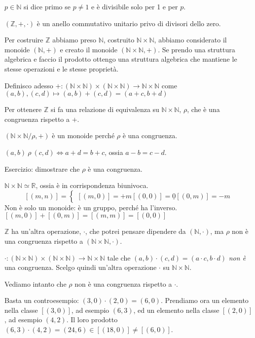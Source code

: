 $p \in \mathbb{N}$ si dice primo se $p \neq 1$ e \`e divisibile solo per 1 e per $p$.

$(\mathbb{Z}, +, \cdot)$ \`e un anello commutativo unitario privo di divisori dello zero.

Per costruire $\mathbb{Z}$ abbiamo preso $\mathbb{N}$, costruito $\mathbb{N} \times \mathbb{N}$, abbiamo considerato il monoide $(\mathbb{N}, +)$ e creato il monoide $(\mathbb{N} \times \mathbb{N}, +)$. Se prendo una struttura algebrica e faccio il prodotto ottengo una struttura algebrica che mantiene le stesse operazioni e le stesse propriet\`a.

Definisco adesso $+ : (\mathbb{N} \times \mathbb{N}) \times (\mathbb{N} \times \mathbb{N}) \to \mathbb{N} \times \mathbb{N}$ come $(a,b), (c,d) \mapsto (a,b) + (c,d) = (a + c, b + d)$

Per ottenere $\mathbb{Z}$ si fa una relazione di equivalenza su $\mathbb{N} \times \mathbb{N}$, $\rho$, che \`e una congruenza rispetto a $+$.

$(\mathbb{N} \times \mathbb{N} / \rho, +)$ \`e un monoide perch\'e $\rho$ \`e una congruenza. 

$(a,b) \ \rho \ (c,d) \Leftrightarrow a + d = b + c$, ossia $a - b = c - d$.

Esercizio: dimostrare che $\rho$ \`e una congruenza.


$\mathbb{N} \times \mathbb{N} \simeq \mathbb{R}$, ossia \`e in corrispondenza biunivoca.
\[
[(m,n)] = 
\begin{cases}
[(m,0)] = +m
[(0,0)] = \underline{0}
[(0,m)] = -m
\end{cases}
\]
Non \`e solo un monoide: \`e un gruppo, perch\'e ha l'inverso. $[(m, 0)] + [(0, m)] = [(m, m)] = [(0,0)]$

$\mathbb{Z}$ ha un'altra operazione, $\cdot$, che potrei pensare dipendere da $(\mathbb{N}, \cdot)$, ma $\rho$ non \`e una congruenza rispetto a $(\mathbb{N} \times \mathbb{N}, \cdot)$.

$\cdot : (\mathbb{N} \times \mathbb{N}) \times (\mathbb{N} \times \mathbb{N}) \to \mathbb{N} \times \mathbb{N}$ tale che $(a, b) \cdot (c, d) = (a \cdot c, b \cdot d)$ \textit{non \`e} una congruenza. Scelgo quindi un'altra operazione $\cdot$ su $\mathbb{N} \times \mathbb{N}$.

Vediamo intanto che $\rho$ non \`e una congruenza rispetto a $\cdot$.

Basta un controesempio: $(3, 0) \cdot (2, 0) = (6, 0)$. Prendiamo ora un elemento nella classe $[(3,0)]$, ad esempio $(6,3)$, ed un elemento nella classe $[(2,0)]$, ad esempio $(4,2)$. Il loro prodotto $(6,3) \cdot (4,2) = (24,6) \in [(18,0)] \neq [(6,0)]$.

